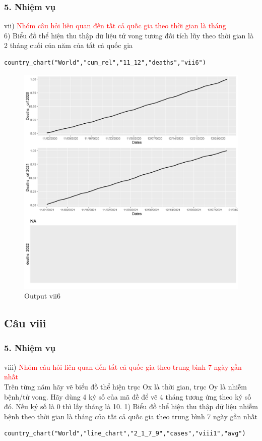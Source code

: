 \documentclass[english,10pt,table]{beamer}
\begin{document}
\begin{frame}[fragile]
\frametitle{5.  Nhiệm vụ}
vii) \textcolor{red}{Nhóm câu hỏi liên quan đến tất cả quốc gia theo thời gian là tháng }\\
    6) Biểu đồ thể hiện thu thập dữ liệu tử vong tương đối tích lũy theo thời gian là 2 tháng cuối của năm của tất cả quốc gia
 \begin{lstlisting}[frame = single,basicstyle=\tiny]
country_chart("World","cum_rel","11_12","deaths","vii6")
		\end{lstlisting}
			\begin{figure}[h!]
	\begin{center}
		    \includegraphics[scale = 0.23]{Images/VII/vii6 World .jpeg}
		     \caption{Output vii6}
		\end{center}
		\end{figure}
\end{frame}

\subsection{Câu viii}
\begin{frame}[fragile]
\frametitle{5.  Nhiệm vụ}
viii) \textcolor{red}{Nhóm câu hỏi liên quan đến tất cả quốc gia theo trung bình 7 ngày gần nhất}\\
Trên từng năm hãy vẽ biểu đồ thể hiện trục Ox là thời gian, trục Oy là nhiễm bệnh/tử vong. Hãy dùng 4 ký số của mã đề để vẽ 4 tháng tương ứng theo ký số đó. Nếu ký số là 0 thì lấy tháng là 10. 
    1) Biểu đồ thể hiện thu thập dữ liệu nhiễm bệnh theo thời gian là tháng của tất cả quốc gia theo trung bình 7 ngày gần nhất
\begin{lstlisting}[frame = single,basicstyle=\tiny]
country_chart("World","line_chart","2_1_7_9","cases","viii1","avg")
    \end{lstlisting}
\end{frame}
\end{document}
